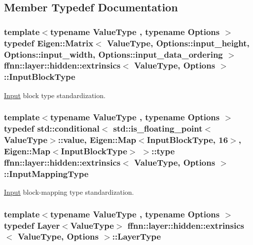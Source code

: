 \subsection{Member Typedef Documentation}
\hypertarget{structffnn_1_1layer_1_1hidden_1_1extrinsics_af5299a48a27726ba0d407ecb28890092}{
\subsubsection[{Input\-Block\-Type}]{\setlength{\rightskip}{0pt plus 5cm}template$<$typename Value\-Type , typename Options $>$ typedef Eigen\-::\-Matrix$<$ Value\-Type, Options\-::input\-\_\-height, Options\-::input\-\_\-width, Options\-::input\-\_\-data\-\_\-ordering $>$ {\bf ffnn\-::layer\-::hidden\-::extrinsics}$<$ Value\-Type, Options $>$\-::{\bf Input\-Block\-Type}}}\label{structffnn_1_1layer_1_1hidden_1_1extrinsics_af5299a48a27726ba0d407ecb28890092}


\hyperlink{classffnn_1_1layer_1_1_input}{Input} block type standardization. 

\hypertarget{structffnn_1_1layer_1_1hidden_1_1extrinsics_a62256f740b1aaf253c9992d15cda7eab}{
\subsubsection[{Input\-Mapping\-Type}]{\setlength{\rightskip}{0pt plus 5cm}template$<$typename Value\-Type , typename Options $>$ typedef std\-::conditional$<$ std\-::is\-\_\-floating\-\_\-point$<$Value\-Type$>$\-::value, Eigen\-::\-Map$<${\bf Input\-Block\-Type}, 16$>$, Eigen\-::\-Map$<${\bf Input\-Block\-Type}$>$ $>$\-::type {\bf ffnn\-::layer\-::hidden\-::extrinsics}$<$ Value\-Type, Options $>$\-::{\bf Input\-Mapping\-Type}}}\label{structffnn_1_1layer_1_1hidden_1_1extrinsics_a62256f740b1aaf253c9992d15cda7eab}


\hyperlink{classffnn_1_1layer_1_1_input}{Input} block-\/mapping type standardization. 

\hypertarget{structffnn_1_1layer_1_1hidden_1_1extrinsics_a06f383c22ed682751b9a4cb8855da9eb}{
\subsubsection[{Layer\-Type}]{\setlength{\rightskip}{0pt plus 5cm}template$<$typename Value\-Type , typename Options $>$ typedef {\bf Layer}$<$Value\-Type$>$ {\bf ffnn\-::layer\-::hidden\-::extrinsics}$<$ Value\-Type, Options $>$\-::{\bf Layer\-Type}}}\label{structffnn_1_1layer_1_1hidden_1_1extrinsics_a06f383c22ed682751b9a4cb8855da9eb}


